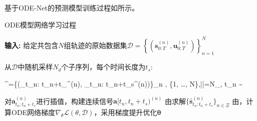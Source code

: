 
基于ODE-Net的预测模型训练过程如所示。

\begin{algorithm}[hpbt]

\caption{ODE模型网络学习过程} %
\label{alg:dyn}
\hspace*{0.02in} {\bf 输入:} %
给定共包含$N$组轨迹的原始数据集$\mathcal{D}=\left\{\left(\mathbf{s}_{0: T}^{(n)}, \mathbf{u}_{0: T}^{(n)}\right)\right\}_{n=1}^{N}$

\begin{algorithmic}[1]
\State 从$\mathcal{D}$中随机采样$N_d$个子序列，每个时间长度为$t_s$:
\begin{flalign}
^{\prime}=\left\{\left(_{t_{n}: t_{n}+t_{}}^{(n)}, _{t_{n}: t_{n}+t_{s}}^{(n)}\right)\right\}_{n \in \Xi}, \Xi \subset\{1, \ldots, N\},|\Xi|=N_{}, t_{n} \sim {}\left[0, T-t_{s}\right]
\end{flalign}
\State 对$\mathbf{a}_{t_{n}: t_{n}+t_{s}}^{(n)}$进行插值，构建连续信号$\mathbf{a}[t_{n}, t_{n}+t_{s})^{(n)}$
\State 由求解$\{\hat{\mathbf{s}}_{t_n:t_n+t_s}^{(n)}\}_{n \in \Xi}$
\State 由，计算ODE网络梯度$\nabla_\theta \mathcal{L}(\theta, \mathcal{D})$，采用梯度提升优化$\boldsymbol{\theta}$
\EndFor

\end{algorithmic}
\end{algorithm}









